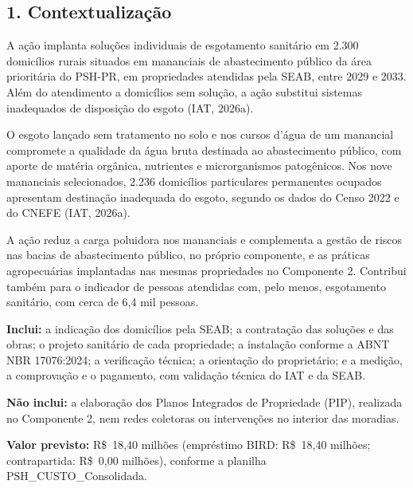 

{}
\subsection*{1. Contextualização}

A ação implanta soluções individuais de esgotamento sanitário em 2.300 domicílios rurais situados em mananciais de abastecimento público da área prioritária do PSH-PR, em propriedades atendidas pela SEAB, entre 2029 e 2033. Além do atendimento a domicílios sem solução, a ação substitui sistemas inadequados de disposição do esgoto (IAT, 2026a).

O esgoto lançado sem tratamento no solo e nos cursos d'água de um manancial compromete a qualidade da água bruta destinada ao abastecimento público, com aporte de matéria orgânica, nutrientes e microrganismos patogênicos. Nos nove mananciais selecionados, 2.236 domicílios particulares permanentes ocupados apresentam destinação inadequada do esgoto, segundo os dados do Censo 2022 e do CNEFE (IAT, 2026a).

A ação reduz a carga poluidora nos mananciais e complementa a gestão de riscos nas bacias de abastecimento público, no próprio componente, e as práticas agropecuárias implantadas nas mesmas propriedades no Componente 2. Contribui também para o indicador de pessoas atendidas com, pelo menos, esgotamento sanitário, com cerca de 6,4 mil pessoas.

\textbf{Inclui:} a indicação dos domicílios pela SEAB; a contratação das soluções e das obras; o projeto sanitário de cada propriedade; a instalação conforme a ABNT NBR 17076:2024; a verificação técnica; a orientação do proprietário; e a medição, a comprovação e o pagamento, com validação técnica do IAT e da SEAB.

\textbf{Não inclui:} a elaboração dos Planos Integrados de Propriedade (PIP), realizada no Componente 2, nem redes coletoras ou intervenções no interior das moradias.

\textbf{Valor previsto:} R\$~18,40 milhões (empréstimo BIRD: R\$~18,40 milhões; contrapartida: R\$~0,00 milhões), conforme a planilha PSH\_CUSTO\_Consolidada.

